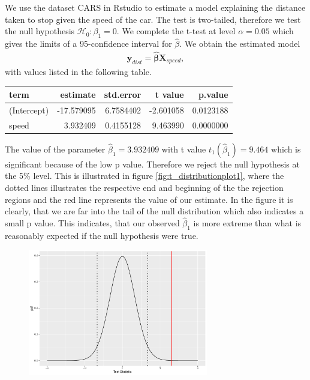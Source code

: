 \begin{example}  \label{ex:ttest}
We use the dataset CARS in Rstudio to estimate a model explaining the distance taken to stop given the speed of the car. The test is two-tailed, therefore we test the null hypothesis $\mathcal{H}_0:\beta_1=0.$
We complete the t-test at level $\alpha=0.05$ which gives the limits of a 95-confidence interval for $\hat{\beta}$.
We obtain the estimated model
\begin{align*}
    \textbf{y}_{dist} = \hat{\boldsymbol{\beta}} \boldsymbol{X}_{speed},
\end{align*}
with values listed in the following table.

\begin{table}[H]
\centering
\begin{tabular}{lrrrr}
\toprule
\textbf{term} & \textbf{estimate} & \textbf{std.error} & \textbf{t value} & \textbf{p.value}\\
\midrule
(Intercept) & -17.579095 & 6.7584402 & -2.601058 & 0.0123188\\
speed & 3.932409 & 0.4155128 & 9.463990 & 0.0000000\\
\bottomrule
\end{tabular}
\end{table}
The value of the parameter $\hat{\beta}_1=3.932409$ with t value $t_1(\hat{\beta}_1) = 9.464$ which is significant because of the low p value. 
Therefore we reject the null hypothesis at the 5\% level. This is illustrated in figure \ref{fig:t_distributionplot1}, where the dotted lines illustrates the respective end and beginning of the the rejection regions and the red line represents the value of our estimate. 
In the figure it is clearly, that we are far into the tail of the null distribution which also indicates a small p value. 
This indicates, that our observed $\hat{\beta}_1$ is more extreme than what is reasonably expected if the null hypothesis were true.
\begin{figure}[H]
    \centering
    \includegraphics[width = 0.7\textwidth]{figures/Nanna/t_distributionPlot.pdf}

\end{figure}
\end{example}
